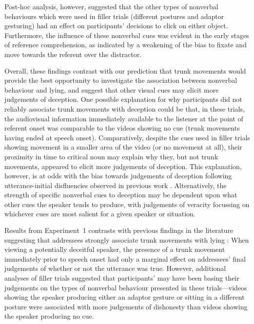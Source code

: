 \documentclass[a4paper,man,natbib]{apa6}
\begin{document}
Post-hoc analysis, however, suggested that the other types of nonverbal behaviours which were used in filler trials (different postures and adaptor gesturing) had an effect on participants' decisions to click on either object. 
Furthermore, the influence of these nonverbal cues was evident in the early stages of reference comprehension, as indicated by a weakening of the bias to fixate and move towards the referent over the distractor. 

Overall, these findings contrast with our prediction that trunk movements would provide the best opportunity to investigate the association between nonverbal behaviour and lying, and suggest that other visual cues may elicit more judgements of deception. 
One possible explanation for why participants did not reliably associate trunk movements with deception could be that, in these trials, the audiovisual information immediately available to the listener at the point of referent onset was comparable to the videos showing no cue (trunk movements having ended at speech onset).
Comparatively, despite the cues used in filler trials showing movement in a smaller area of the video (or no movement at all), their proximity in time to critical noun may explain why they, but not trunk movements, appeared to elicit more judgements of deception.
This explanation, however, is at odds with the bias towards judgements of deception following utterance-initial disfluencies observed in previous work \citep[][Experiment~1]{Loy2017}.
Alternatively, the strength of specific nonverbal cues to deception may be dependent upon what other cues the speaker tends to produce, with judgements of veracity focussing on whichever cues are most salient for a given speaker or situation. 

Results from Experiment~1 contrasts with previous findings in the literature suggesting that addressees strongly associate trunk movements with lying \citep[e.g.][]{Vrij1996a, Zuckerman1981}: When viewing a potentially deceitful speaker, the presence of a trunk movement immediately prior to speech onset had only a marginal effect on addressees' final judgements of whether or not the utterance was true.
However, additional analyses of filler trials suggested that participants' may have been basing their judgements on the types of nonverbal behaviour presented in these trials---videos showing the speaker producing either an adaptor gesture or sitting in a different posture were associated with more judgements of dishonesty than videos showing the speaker producing no cue.
\end{document}
